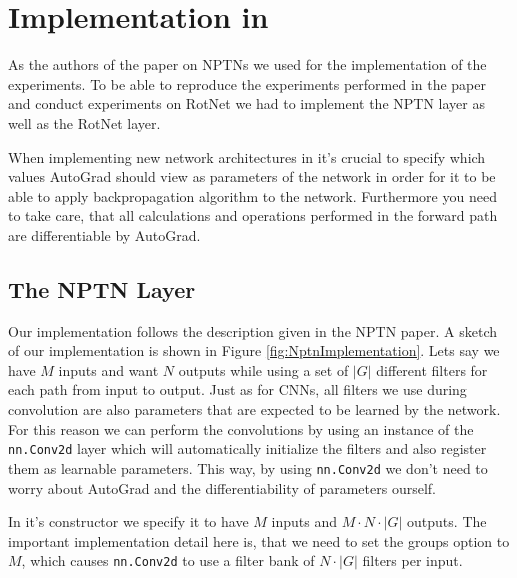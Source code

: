 \documentclass{llncs}
\begin{document}
\section{Implementation in \pytorch}
\newcommand{\nnaffinegrid}{\nolinkurl{nn.functional.affine\textunderscore grid} }
\newcommand{\nngridsample}{\nolinkurl{nn.functional.grid\textunderscore sample} }
\newcommand{\nnConvFunction}{\nolinkurl{nn.functional.conv2d} }
\newcommand{\nnConvLayer}{\nolinkurl{nn.Conv2d} }
\newcommand{\nnMaxPool}{\nolinkurl{nn.MaxPool3d} }
\newcommand{\nnAvgPool}{\nolinkurl{nn.AvgPool3d} }
\newcommand{\nnTensor}{\nolinkurl{nn.Tensor} }
\newcommand{\nnParameter}{\nolinkurl{torch.nn.Parameter} }

As the authors of the paper on NPTNs \cite{NPTN18} we used \pytorch for the implementation of the experiments.
To be able to reproduce the experiments performed in the paper and conduct experiments on RotNet we had to implement the NPTN layer as well as the RotNet layer.

When implementing new network architectures in \pytorch it's crucial to specify which values AutoGrad should view as parameters of the network in order for it to be able to apply backpropagation algorithm to the network. Furthermore you need to take care, that all calculations and operations performed in the forward path are differentiable by AutoGrad.
\subsection{The NPTN Layer}
Our implementation follows the description given in the NPTN paper. A sketch of our implementation is shown in Figure \ref{fig:NptnImplementation}.
Lets say we have $M$ inputs and want $N$ outputs while using a set of $|G|$ different filters for each path from input to output.
Just as for CNNs, all filters we use during convolution are also parameters that are expected to be learned by the network.
For this reason we can perform the convolutions by using an instance of the \nnConvLayer layer which will automatically initialize the filters and also register them as learnable parameters. This way, by using \nnConvLayer we don't need to worry about AutoGrad and the differentiability of parameters ourself.

In it's constructor we specify it to have $M$ inputs and $M \cdot N \cdot |G|$ outputs. The important implementation detail here is, that we need to set the groups option to $M$, which causes \nnConvLayer to use a filter bank of $N\cdot|G|$ filters per input.
\end{document}
